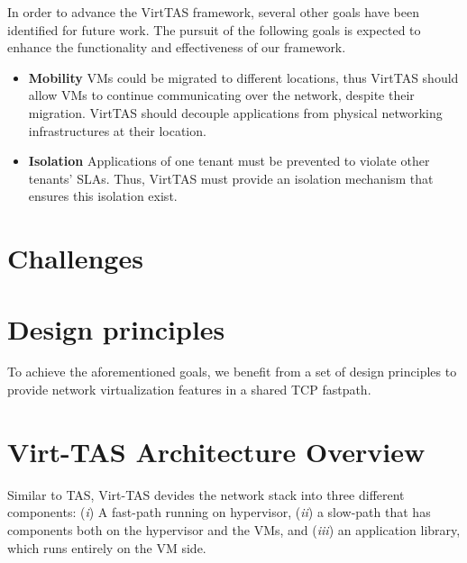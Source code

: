     In order to advance the VirtTAS framework, several other goals have been identified for 
    future work. The pursuit of the following goals is expected to enhance the functionality 
    and effectiveness of our framework. 
    
\begin{itemize}
    \item \textbf{Mobility} %
    VMs could be migrated to different locations, thus VirtTAS should allow VMs to continue 
    communicating over the network, despite their migration. VirtTAS should decouple applications 
    from physical networking infrastructures at their location.
    \item \textbf{Isolation} 
    Applications of one tenant must be prevented to violate other tenants' SLAs. 
    Thus, VirtTAS must provide 
    an isolation mechanism that ensures this isolation exist.

\end{itemize}

\section{Challenges}

\section{Design principles}
To achieve the aforementioned goals, we benefit from a set of design principles 
to provide network virtualization features in a shared TCP fastpath.

\section{Virt-TAS Architecture Overview}

Similar to TAS, Virt-TAS devides the network stack into three different components:
(\emph{i}) A fast-path running on hypervisor, (\emph{ii}) a slow-path that has components
both on the hypervisor and the VMs, and (\emph{iii}) an application library, which 
runs entirely on the VM side. 



